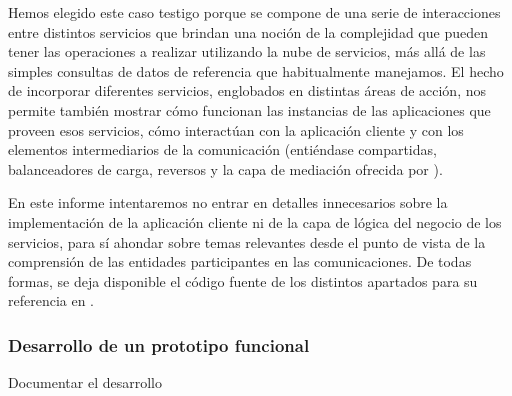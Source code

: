 

Hemos elegido este caso testigo porque se compone de una serie de interacciones entre distintos servicios que brindan una noción de la complejidad que pueden tener las operaciones a realizar utilizando la nube de servicios, más allá de las simples consultas de datos de referencia que habitualmente manejamos. El hecho de incorporar diferentes servicios, englobados en distintas áreas de acción, nos permite también mostrar cómo funcionan las instancias de las aplicaciones que proveen esos servicios, cómo interactúan con la aplicación cliente y con los elementos intermediarios de la comunicación (entiéndase  compartidas, balanceadores de carga,  reversos y la capa de mediación ofrecida por ).

En este informe intentaremos no entrar en detalles innecesarios sobre la implementación de la aplicación cliente ni de la capa de lógica del negocio de los servicios, para sí ahondar sobre temas relevantes desde el punto de vista de la comprensión de las entidades participantes en las comunicaciones. De todas formas, se deja disponible el código fuente de los distintos apartados para su referencia en .


\subsubsection{Desarrollo de un prototipo funcional}

Documentar el desarrollo
